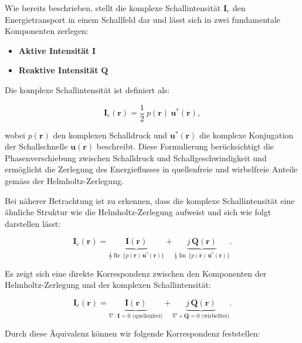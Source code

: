 Wie bereits beschrieben, stellt die komplexe Schallintensität $\mathbf{I}_c$ den Energietransport in einem Schallfeld dar und lässt sich in zwei fundamentale Komponenten zerlegen:
 
\begin{itemize}
\item \textbf{Aktive Intensität} $\mathbf{I}$
\item \textbf{Reaktive Intensität} $\mathbf{Q}$
\end{itemize}
 
Die komplexe Schallintensität ist definiert als:
 
\begin{equation}
\mathbf{I}_c (\mathbf{r}) = \frac{1}{2} \: p(\mathbf{r}) \: \mathbf{u}^{*}(\mathbf{r}),
\end{equation}
 
\noindent wobei $p(\mathbf{r})$ den komplexen Schalldruck und $\mathbf{u}^{*}(\mathbf{r})$ die komplexe Konjugation der Schallschnelle $\mathbf{u}(\mathbf{r})$ beschreibt. Diese Formulierung berücksichtigt die Phasenverschiebung zwischen Schalldruck und Schallgeschwindigkeit und ermöglicht die Zerlegung des Energieflusses in quellenfreie und wirbelfreie Anteile gemäss der Helmholtz-Zerlegung.
 
Bei näherer Betrachtung ist zu erkennen, dass die komplexe Schallintensität eine ähnliche Struktur wie die Helmholtz-Zerlegung aufweist und sich wie folgt darstellen lässt:
 
\begin{equation}
\mathbf{I}_c (\mathbf{r}) = \underbrace{\mathbf{I}(\mathbf{r})}_{\frac{1}{2} \operatorname{Re} \, \{ p(\mathbf{r}) \, \mathbf{u}^*(\mathbf{r}) \}} + \underbrace{j\,\mathbf{Q}(\mathbf{r})}_{\frac{1}{2} \operatorname{Im} \, \{ p(\mathbf{r}) \, \mathbf{u}^*(\mathbf{r}) \}}.
\end{equation}
 
\noindent Es zeigt sich eine direkte Korrespondenz zwischen den Komponenten der Helmholtz-Zerlegung und der komplexen Schallintensität:
 
\begin{equation}
\mathbf{I}_c (\mathbf{r}) = \underbrace{\mathbf{I}(\mathbf{r})}_{\nabla \cdot \mathbf{I} = 0 \text{ (quellenfrei)}} + \underbrace{j\,\mathbf{Q}(\mathbf{r})}_{\nabla \times \mathbf{Q} = 0 \text{ (wirbelfrei)}}.
\end{equation}
 
\noindent Durch diese Äquivalenz können wir folgende Korrespondenz feststellen:
 
